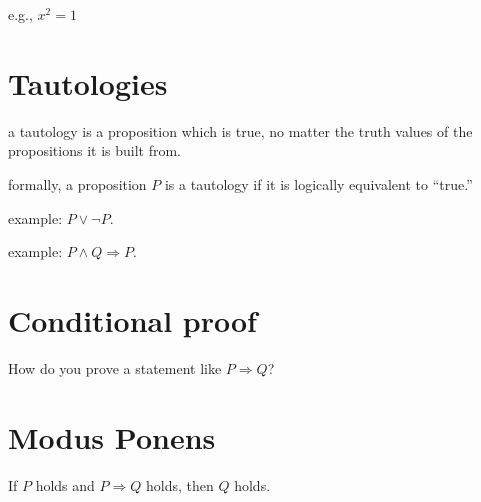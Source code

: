\documentclass[12pt]{handout}
\begin{document}
e.g., $x^2 = 1$


\section*{Tautologies}

a tautology is a proposition which is true, no matter the truth values
of the propositions it is built from.

formally, a proposition $P$ is a tautology if it is logically
equivalent to ``true.''

example: $P \vee \neg P$.


example: $P \wedge Q \Rightarrow P$.

\section*{Conditional proof}

How do you prove a statement like $P \Rightarrow Q$?

\section*{Modus Ponens}

If $P$ holds and $P \Rightarrow Q$ holds, then $Q$ holds.
\end{document}

